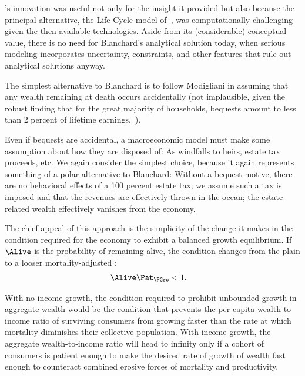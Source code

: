 \documentclass[ProjectDLO]{subfiles}
\begin{document}
\cite{blanchardFinite}'s innovation was useful not only for the insight it provided but also because the principal alternative, the Life Cycle model of~\cite{modiglianiWealth}, was computationally challenging given the then-available technologies. Aside from its (considerable) conceptual value, there is no need for Blanchard's analytical solution today, when serious modeling incorporates uncertainty, constraints, and other features that rule out analytical solutions anyway.%

The simplest alternative to Blanchard is to follow Modigliani in assuming that any wealth remaining at death occurs accidentally (not implausible, given the robust finding that for the great majority of households, bequests amount to less than 2 percent of lifetime earnings,~\cite{hendricksBequests,hendricksSmallBequests}).

Even if bequests are accidental, a macroeconomic model must make some assumption about how they are disposed of: As windfalls to heirs, estate tax proceeds, etc. We again consider the simplest choice, because it again represents something of a polar alternative to Blanchard: Without a bequest motive, there are no behavioral effects of a 100 percent estate tax; we assume such a tax is imposed and that the revenues are effectively thrown in the ocean; the estate-related wealth effectively vanishes from the economy.

The chief appeal of this approach is the simplicity of the change it makes in the condition required for the economy to exhibit a balanced growth equilibrium.  If $\Alive$ is the probability of remaining alive, the condition changes from the plain {\GIC} to a looser mortality-adjusted {\GIC}:
\hypertarget{GICMrt}{}
\begin{align}
  \Alive  \Pat_{\PGro} & < 1. \label{eq:GICMrt}
\end{align}

With no income growth, the condition required to prohibit unbounded growth in aggregate wealth would be the condition that prevents the per-capita wealth to income ratio of surviving consumers from growing faster than the rate at which mortality diminishes their collective population.  With income growth, the aggregate wealth-to-income ratio will head to infinity only if a cohort of consumers is patient enough to make the desired rate of growth of wealth fast enough to counteract combined erosive forces of mortality and productivity.
\end{document}
